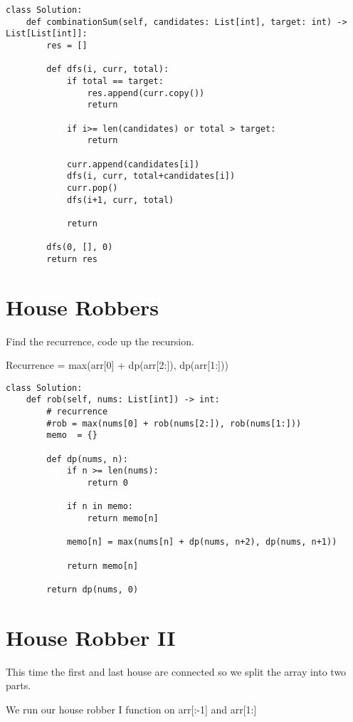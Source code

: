 \documentclass[24pt, a4]{article}
\begin{document}
\begin{lstlisting}
class Solution:
    def combinationSum(self, candidates: List[int], target: int) -> List[List[int]]:
        res = []
        
        def dfs(i, curr, total):
            if total == target:
                res.append(curr.copy())
                return
            
            if i>= len(candidates) or total > target:
                return
            
            curr.append(candidates[i])
            dfs(i, curr, total+candidates[i])
            curr.pop()
            dfs(i+1, curr, total)
            
            return
        
        dfs(0, [], 0)
        return res
\end{lstlisting}

\section{House Robbers}

Find the recurrence, code up the recursion.

Recurrence = max(arr[0] + dp(arr[2:]), dp(arr[1:]))

\begin{lstlisting}
class Solution:
    def rob(self, nums: List[int]) -> int:
        # recurrence
        #rob = max(nums[0] + rob(nums[2:]), rob(nums[1:]))
        memo  = {}
        
        def dp(nums, n):
            if n >= len(nums):
                return 0
            
            if n in memo:
                return memo[n]
            
            memo[n] = max(nums[n] + dp(nums, n+2), dp(nums, n+1))
            
            return memo[n]
        
        return dp(nums, 0)
\end{lstlisting}

\section{House Robber II}

This time the first and last house are connected so we split the array into two parts.

We run our house robber I function on arr[:-1] and arr[1:]
\end{document}
